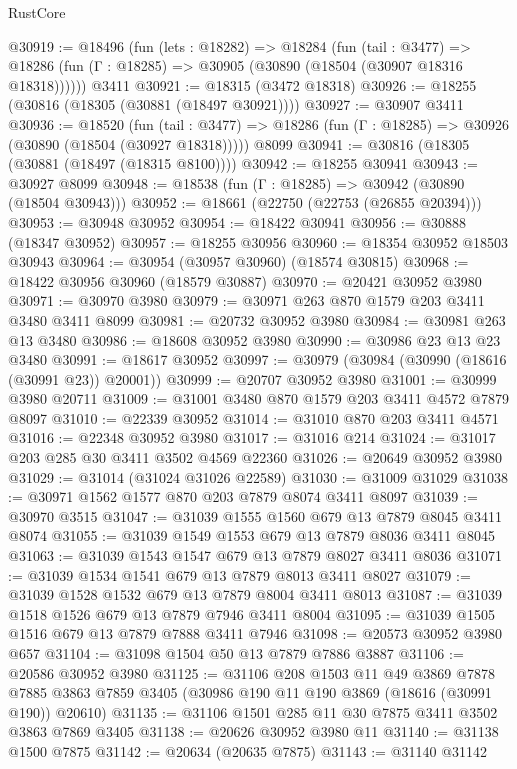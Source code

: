 \begin{lexlean}{RustCore}
\begin{coremodule}
@30919 := @18496
    (fun (lets : @18282) =>
    @18284
      (fun (tail : @3477) =>
      @18286 (fun (Γ : @18285) => @30905 (@30890 (@18504 (@30907 @18316 @18318))))))
    @3411
@30921 := @18315 (@3472 @18318)
@30926 := @18255 (@30816 (@18305 (@30881 (@18497 @30921))))
@30927 := @30907 @3411
@30936 := @18520
    (fun (tail : @3477) => @18286 (fun (Γ : @18285) => @30926 (@30890 (@18504 (@30927 @18318)))))
    @8099
@30941 := @30816 (@18305 (@30881 (@18497 (@18315 @8100))))
@30942 := @18255 @30941
@30943 := @30927 @8099
@30948 := @18538 (fun (Γ : @18285) => @30942 (@30890 (@18504 @30943)))
@30952 := @18661 (@22750 (@22753 (@26855 @20394)))
@30953 := @30948 @30952
@30954 := @18422 @30941
@30956 := @30888 (@18347 @30952)
@30957 := @18255 @30956
@30960 := @18354 @30952 @18503 @30943
@30964 := @30954 (@30957 @30960) (@18574 @30815)
@30968 := @18422 @30956 @30960 (@18579 @30887)
@30970 := @20421 @30952 @3980
@30971 := @30970 @3980
@30979 := @30971 @263 @870 @1579 @203 @3411 @3480 @3411 @8099
@30981 := @20732 @30952 @3980
@30984 := @30981 @263 @13 @3480
@30986 := @18608 @30952 @3980
@30990 := @30986 @23 @13 @23 @3480
@30991 := @18617 @30952
@30997 := @30979 (@30984 (@30990 (@18616 (@30991 @23)) @20001))
@30999 := @20707 @30952 @3980
@31001 := @30999 @3980 @20711
@31009 := @31001 @3480 @870 @1579 @203 @3411 @4572 @7879 @8097
@31010 := @22339 @30952
@31014 := @31010 @870 @203 @3411 @4571
@31016 := @22348 @30952 @3980
@31017 := @31016 @214
@31024 := @31017 @203 @285 @30 @3411 @3502 @4569 @22360
@31026 := @20649 @30952 @3980
@31029 := @31014 (@31024 @31026 @22589)
@31030 := @31009 @31029
@31038 := @30971 @1562 @1577 @870 @203 @7879 @8074 @3411 @8097
@31039 := @30970 @3515
@31047 := @31039 @1555 @1560 @679 @13 @7879 @8045 @3411 @8074
@31055 := @31039 @1549 @1553 @679 @13 @7879 @8036 @3411 @8045
@31063 := @31039 @1543 @1547 @679 @13 @7879 @8027 @3411 @8036
@31071 := @31039 @1534 @1541 @679 @13 @7879 @8013 @3411 @8027
@31079 := @31039 @1528 @1532 @679 @13 @7879 @8004 @3411 @8013
@31087 := @31039 @1518 @1526 @679 @13 @7879 @7946 @3411 @8004
@31095 := @31039 @1505 @1516 @679 @13 @7879 @7888 @3411 @7946
@31098 := @20573 @30952 @3980 @657
@31104 := @31098 @1504 @50 @13 @7879 @7886 @3887
@31106 := @20586 @30952 @3980
@31125 := @31106
    @208
    @1503
    @11
    @49
    @3869
    @7878
    @7885
    @3863
    @7859
    @3405
    (@30986 @190 @11 @190 @3869 (@18616 (@30991 @190)) @20610)
@31135 := @31106 @1501 @285 @11 @30 @7875 @3411 @3502 @3863 @7869 @3405
@31138 := @20626 @30952 @3980 @11
@31140 := @31138 @1500 @7875
@31142 := @20634 (@20635 @7875)
@31143 := @31140 @31142

\end{coremodule}
\end{lexlean}
